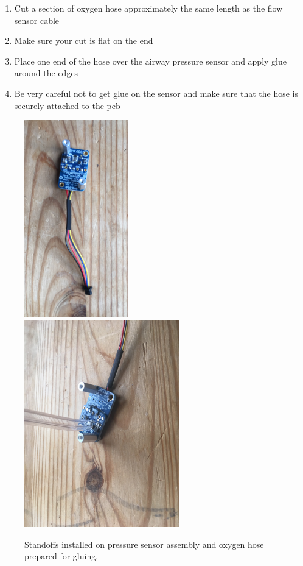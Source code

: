 \documentclass[11pt, letterpaper]{article}
\begin{document}
\begin{enumerate}
\begin{enumerate}[label=5.\arabic*]
\begin{enumerate}[label=5.1.\arabic*]
\item
Cut a section of oxygen hose approximately the same length as the flow sensor cable
\item
Make sure your cut is flat on the end
\item
Place one end of the hose over the airway pressure sensor and apply glue around the edges
\item
Be very careful not to get glue on the sensor and make sure that the hose is securely attached to the pcb
\end{enumerate}
\begin{figure}[H]
\centering
\includegraphics[width=0.4\textwidth]{images/bme_standoffs.JPG}
\includegraphics[width=0.6\textwidth, angle =90 ]{images/hotglue.JPG}
\caption{Standoffs installed on pressure sensor assembly and oxygen hose prepared for gluing.}
\label{fig:bme_glue}
\end{figure}


\end{enumerate}
\end{enumerate}
\end{document}
